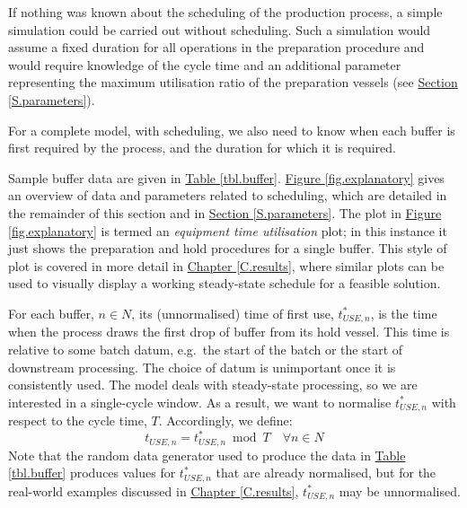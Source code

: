 If nothing was known about the scheduling of the production process, a simple
simulation could be carried out without scheduling.
Such a simulation would assume a fixed duration for all operations in the
preparation procedure and would require knowledge of the cycle time and an
additional parameter representing the maximum utilisation ratio of the
preparation vessels (see \hyperref[S.parameters]{Section \ref*{S.parameters}}).

For a complete model, with scheduling, we also need to know when each buffer
is first required by the process, and the duration for which it is required.

Sample buffer data are given in \hyperref[tbl.buffer]{Table \ref*{tbl.buffer}}.
\hyperref[fig.explanatory]{Figure \ref*{fig.explanatory}} gives an overview of
data and parameters related to scheduling, which are detailed in the remainder
of this section and in \hyperref[S.parameters]{Section \ref*{S.parameters}}.
The plot in \hyperref[fig.explanatory]{Figure \ref*{fig.explanatory}} is
termed an \emph{equipment time utilisation} plot; in this instance it just
shows the preparation and hold procedures for a single buffer.
This style of plot is covered in more detail in
\hyperref[C.results]{Chapter \ref*{C.results}}, where similar plots can be used
to visually display a working steady-state schedule for a feasible solution.

For each buffer, $n \in N$, its (unnormalised) time of first use,
$t_{\mathit{USE},n}^{*}$, is the time when the process draws the first drop of
buffer from its hold vessel.
This time is relative to some batch datum, e.g.\ the start of the batch or the
start of downstream processing.
The choice of datum is unimportant once it is consistently used. 
The model deals with steady-state processing, so we are interested in a 
single-cycle window.
As a result, we want to normalise $t_{\mathit{USE},n}^{*}$ with respect to the
cycle time, $T$.
Accordingly, we define:
\begin{equation}
    t_{\mathit{USE},n} = t_{\mathit{USE},n}^{*} \enspace \text{mod} \enspace 
    T \quad \forall n \in N
\end{equation}
Note that the random data generator used to produce the data in 
\hyperref[tbl.buffer]{Table \ref*{tbl.buffer}} produces values for 
$t_{\mathit{USE},n}^{*}$ that are already normalised, but for the real-world
examples discussed in \hyperref[C.results]{Chapter \ref*{C.results}}, 
$t_{\mathit{USE},n}^{*}$ may be unnormalised.

